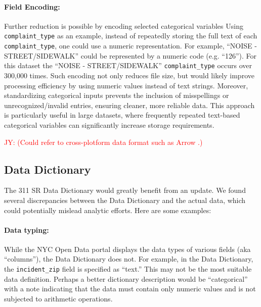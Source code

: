 \documentclass[linenumber]{jdsart}
\newcommand{\jy}[1]{\textcolor{red}{JY: (#1)}}
\begin{document}
\paragraph{Field Encoding:} Further reduction is possible 
by encoding selected categorical variables 
Using \texttt{complaint\_type} as an example,
instead of repeatedly storing the full text of each \texttt{complaint\_type}, 
one could use a numeric representation. For example, 
``NOISE - STREET/SIDEWALK'' could be represented by a 
numeric code (e.g. ``126''). For this dataset the 
``NOISE - STREET/SIDEWALK'' \texttt{complaint\_type} occurs 
over 300,000 times. Such encoding not only reduces file 
size, but would likely improve processing efficiency by using numeric
values instead of text strings. Moreover, standardizing 
categorical inputs prevents the inclusion of misspellings 
or unrecognized/invalid entries, ensuring cleaner, more reliable 
data. This approach is particularly useful in large datasets, where 
frequently repeated text-based categorical variables can 
significantly increase storage requirements.

\jy{Could refer to cross-plotform data format such as Arrow
  \citep{bates2024csv}.}


\subsection{Data Dictionary} 
\label{sec:datadictionary}

The 311 SR Data Dictionary would greatly benefit from an update. We
found several discrepancies between the Data Dictionary and the actual
data, which could potentially mislead analytic efforts. Here are some
examples:


\paragraph{Data typing:} While the NYC Open Data portal displays the data types of 
various fields (aka ``columns''), the Data Dictionary does 
not. For example, in the Data Dictionary, 
the \texttt{incident\_zip} field is specified as ``text.'' This may 
not be the most suitable data definition. Perhaps a better 
dictionary description would be  ``categorical'' with a note 
indicating that the data must contain only numeric values 
and is not subjected to arithmetic operations.
\end{document}
